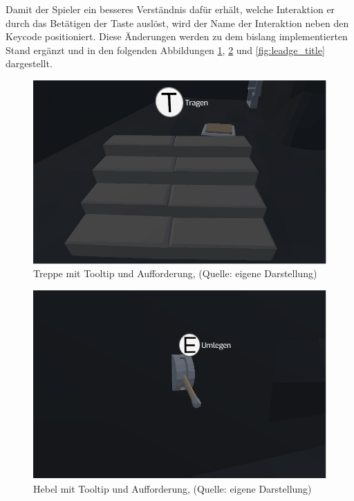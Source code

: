 Damit der Spieler ein besseres Verständnis dafür erhält, welche Interaktion er durch das Betätigen der Taste auslöst, wird der Name der Interaktion neben den Keycode positioniert. Diese Änderungen werden zu dem bislang implementierten Stand ergänzt und in den folgenden Abbildungen \ref{fig:stair_tooltip_title}, \ref{fig:lever_tooltip_title} und \ref{fig:leadge_title} dargestellt.

\begin{figure}[ht]
\centering
\includegraphics[width=0.8\linewidth]{content/pictures/stair_tooltip_title.jpg}
\caption{Treppe mit Tooltip und Aufforderung, (Quelle: eigene Darstellung)}
\label{fig:stair_tooltip_title}
\end{figure}

\begin{figure}[ht]
\centering
\includegraphics[width=0.8\linewidth]{content/pictures/lever_tooltip_title.jpg}
\caption{Hebel mit Tooltip und Aufforderung, (Quelle: eigene Darstellung)}
\label{fig:lever_tooltip_title}
\end{figure}

